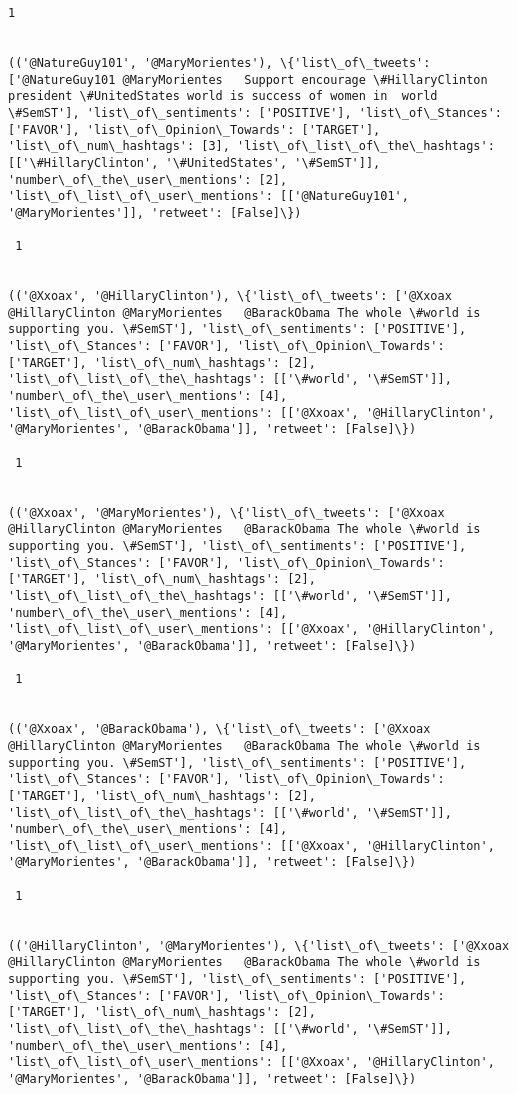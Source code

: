 \documentclass[11pt]{article}
\begin{document}
\begin{Verbatim}[commandchars=\\\{\}]
 1
 

(('@NatureGuy101', '@MaryMorientes'), \{'list\_of\_tweets': ['@NatureGuy101 @MaryMorientes   Support encourage \#HillaryClinton president \#UnitedStates world is success of women in  world \#SemST'], 'list\_of\_sentiments': ['POSITIVE'], 'list\_of\_Stances': ['FAVOR'], 'list\_of\_Opinion\_Towards': ['TARGET'], 'list\_of\_num\_hashtags': [3], 'list\_of\_list\_of\_the\_hashtags': [['\#HillaryClinton', '\#UnitedStates', '\#SemST']], 'number\_of\_the\_user\_mentions': [2], 'list\_of\_list\_of\_user\_mentions': [['@NatureGuy101', '@MaryMorientes']], 'retweet': [False]\})

 1
 

(('@Xxoax', '@HillaryClinton'), \{'list\_of\_tweets': ['@Xxoax @HillaryClinton @MaryMorientes   @BarackObama The whole \#world is supporting you. \#SemST'], 'list\_of\_sentiments': ['POSITIVE'], 'list\_of\_Stances': ['FAVOR'], 'list\_of\_Opinion\_Towards': ['TARGET'], 'list\_of\_num\_hashtags': [2], 'list\_of\_list\_of\_the\_hashtags': [['\#world', '\#SemST']], 'number\_of\_the\_user\_mentions': [4], 'list\_of\_list\_of\_user\_mentions': [['@Xxoax', '@HillaryClinton', '@MaryMorientes', '@BarackObama']], 'retweet': [False]\})

 1
 

(('@Xxoax', '@MaryMorientes'), \{'list\_of\_tweets': ['@Xxoax @HillaryClinton @MaryMorientes   @BarackObama The whole \#world is supporting you. \#SemST'], 'list\_of\_sentiments': ['POSITIVE'], 'list\_of\_Stances': ['FAVOR'], 'list\_of\_Opinion\_Towards': ['TARGET'], 'list\_of\_num\_hashtags': [2], 'list\_of\_list\_of\_the\_hashtags': [['\#world', '\#SemST']], 'number\_of\_the\_user\_mentions': [4], 'list\_of\_list\_of\_user\_mentions': [['@Xxoax', '@HillaryClinton', '@MaryMorientes', '@BarackObama']], 'retweet': [False]\})

 1
 

(('@Xxoax', '@BarackObama'), \{'list\_of\_tweets': ['@Xxoax @HillaryClinton @MaryMorientes   @BarackObama The whole \#world is supporting you. \#SemST'], 'list\_of\_sentiments': ['POSITIVE'], 'list\_of\_Stances': ['FAVOR'], 'list\_of\_Opinion\_Towards': ['TARGET'], 'list\_of\_num\_hashtags': [2], 'list\_of\_list\_of\_the\_hashtags': [['\#world', '\#SemST']], 'number\_of\_the\_user\_mentions': [4], 'list\_of\_list\_of\_user\_mentions': [['@Xxoax', '@HillaryClinton', '@MaryMorientes', '@BarackObama']], 'retweet': [False]\})

 1
 

(('@HillaryClinton', '@MaryMorientes'), \{'list\_of\_tweets': ['@Xxoax @HillaryClinton @MaryMorientes   @BarackObama The whole \#world is supporting you. \#SemST'], 'list\_of\_sentiments': ['POSITIVE'], 'list\_of\_Stances': ['FAVOR'], 'list\_of\_Opinion\_Towards': ['TARGET'], 'list\_of\_num\_hashtags': [2], 'list\_of\_list\_of\_the\_hashtags': [['\#world', '\#SemST']], 'number\_of\_the\_user\_mentions': [4], 'list\_of\_list\_of\_user\_mentions': [['@Xxoax', '@HillaryClinton', '@MaryMorientes', '@BarackObama']], 'retweet': [False]\})


\end{Verbatim}
\end{document}
